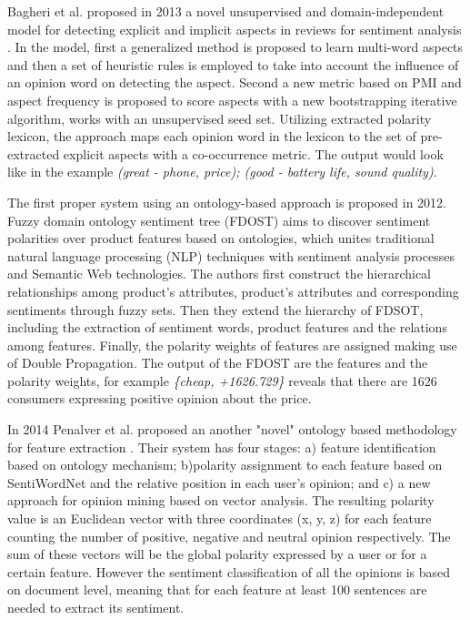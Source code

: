 Bagheri et al. proposed in 2013  a novel unsupervised and domain-independent model for detecting explicit
and implicit aspects in reviews for sentiment analysis \cite{bagheri2013care}. In the model, first a generalized method is proposed to learn multi-word aspects and then a set of heuristic rules is employed to take into account the influence of an opinion word on detecting the aspect. Second a new metric based on PMI and aspect frequency is proposed to score aspects with a new bootstrapping iterative algorithm, works with an unsupervised seed set. Utilizing extracted polarity lexicon, the approach maps each opinion word in the lexicon to the set of pre-extracted explicit aspects with a co-occurrence metric. The output would look like in the example \textit{(great - phone, price); (good - battery life, sound quality)}.

The first proper system using an ontology-based approach is proposed in 2012. Fuzzy domain ontology sentiment tree (FDOST) \cite{liu2012toward} aims to discover sentiment polarities over product features based on ontologies, which unites traditional natural language processing (NLP) techniques with sentiment analysis processes and Semantic Web technologies. The authors first construct the hierarchical relationships among product's attributes, product's attributes and corresponding sentiments through fuzzy sets. Then they extend the hierarchy of FDSOT, including the extraction of sentiment words, product features and the relations among features. Finally, the polarity weights of features are assigned making use of Double Propagation. The output of the FDOST are the features and the polarity weights, for example \textit{\{cheap, +1626.729\}} reveals that there are 1626 consumers expressing positive opinion about the price.

In 2014 Penalver et al. proposed an another "novel" ontology based methodology for feature extraction \cite{penalver2014feature}. Their system has four stages: a) feature identification based on ontology mechanism; b)polarity assignment to each feature based on SentiWordNet and the relative position in each user's opinion; and c) a new approach for opinion mining based on vector analysis. The resulting polarity value is an Euclidean vector with three coordinates (x, y, z) for each feature counting the number of positive, negative and neutral opinion respectively. The sum of these vectors will be the global polarity expressed by a user or for a certain feature. However the sentiment classification of all the opinions is based on document level, meaning that for each feature at least 100 sentences are needed to extract its sentiment.

